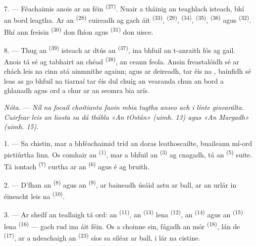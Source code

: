 7. --- Féachaimis anois ar an  féin \textsuperscript{(27)}.
Nuair a tháinig an teaghlach isteach, bhí an bord leagtha. Ar an  \textsuperscript{(28)} cuireadh ag gach áit 
\textsuperscript{(33)},  \textsuperscript{(29)},
 \textsuperscript{(34)},  \textsuperscript{(35)},
 \textsuperscript{(36)} agus 
\textsuperscript{(32)}. Bhí ann freisin  \textsuperscript{(30)} don
fhíon agus  \textsuperscript{(31)} don uisce.

8. --- Thug an  \textsuperscript{(39)} isteach ar dtús an
 \textsuperscript{(37)}, ina bhfuil an t-anraith fós ag
gail. Anois tá sé ag tabhairt an chéad  \textsuperscript{(38)}, an
ceann feola. Ansin freastalóidh sé ar chách leis na cinn atá ainmnithe againn; agus
ar deireadh, tar éis na , bainfidh sé leas as go bhfuil na
tiarnaí tar éis dul chuig an vearanda chun an bord a ghlanadh agus ord a chur ar an
seomra bia arís.

\textit{Nóta.} --- \textit{Níl na focail choitianta faoin mbia tugtha anseo ach i
línte ginearálta. Cuirfear leis an liosta sa dá thábla «An tOstán» (uimh. 13) agus
«An Margadh» (uimh. 15).}

\VUsaut{4.6mm}
\VUsaut{3.0mm}

1. --- Sa chistin, mar a bhféachaimid tríd an doras leathoscailte, buaileann
mí-ord pictiúrtha linn. Os comhair an  \textsuperscript{(1)}, mar
a bhfuil an  \textsuperscript{(3)} ag cnagadh, tá an  \textsuperscript{(5)} suite. Tá  iontach \textsuperscript{(7)}
curtha ar an  \textsuperscript{(6)} agus é ag bruith.

2. --- D'fhan an  \textsuperscript{(8)} agus an  \textsuperscript{(9)}, ar baineadh úsáid astu ar ball, ar an urlár in
éineacht leis na  \textsuperscript{(10)}.

3. --- Ar sheilf an teallaigh tá ord: an 
\textsuperscript{(11)}, an  \textsuperscript{(13)} lena
 \textsuperscript{(12)}, an 
\textsuperscript{(14)} agus an  \textsuperscript{(15)}
lena  \textsuperscript{(16)} --- gach rud ina áit féin. Os a
choinne sin, fágadh an  mór \textsuperscript{(18)}, lán de
 \textsuperscript{(17)}, ar a ndeachaigh an 
\textsuperscript{(23)} síos sa siléar ar ball, i lár na cistine.

